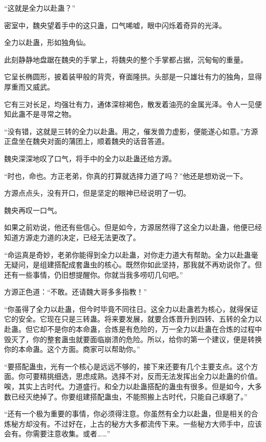 
\begin{this_body}



“这就是全力以赴蛊？”

密室中，魏央望着手中的这只蛊，口气唏嘘，眼中闪烁着奇异的光泽。

全力以赴蛊，形如独角仙。

此刻静静地盘踞在魏央的手掌上，将魏央的整个手掌都占据，沉甸甸的重量。

它呈长椭圆形，披着装甲般的背壳，脊面隆拱。头部是一只雄壮有力的独角，显得厚重而又威武。

它有三对长足，均强壮有力，通体深棕褐色，散发着油亮的金属光泽。令人一见便知此蛊不是寻常之物。

“没有错，这就是三转的全力以赴蛊。用之，催发兽力虚影，便能遂心如意。”方源正盘坐在魏央对面的蒲团上，顺着魏央的话音答道。

魏央深深地叹了口气，将手中的全力以赴蛊还给方源。

“时也，命也。方正老弟，你真的打算就选择力道了吗？”他还是想劝说一下。

方源点点头，没有开口，但是坚定的眼神已经说明了一切。

魏央再叹一口气。

如果之前劝说，他还有些信心。但是如今，方源居然得了这全力以赴蛊，他便已经知道方源走力道的决定，已经无法更改了。

“命运真是奇妙，老弟你能得到全力以赴蛊，对你走力道大有帮助。全力以赴蛊毫无疑问，是组建搭配成套蛊虫的核心。既然你如此坚持，那我就不再劝说你了。但还有一些事情，仍旧想提醒你。你就当我多唠叨几句吧。”

方源正色道：“不敢。还请魏大哥多多指教！”

“你虽得了全力以赴蛊，但今时毕竟不同往日。这全力以赴蛊若为核心，就得保证它的安全。它现在只是三转蛊。将来要发展，就要合炼晋升到四转、五转的全力以赴蛊。但它却不是你的本命蛊，合炼是有危险的，万一全力以赴蛊在合炼的过程中毁灭了，你的整套蛊虫就要面临崩溃的危险。所以，给你的第一个建议，便是转换你的本命蛊。这个方面。商家可以帮助你。”

“要搭配蛊虫，光有一个核心是远远不够的，接下来还要有几个主要支点。这个方面。你可要精挑细选，思虑成熟。选择不对，反而无法发挥出全力以赴蛊的价值。唉，其实上古时代。力道盛行。和全力以赴蛊搭配的蛊虫有很多。但是如今，大多数已经灭绝掉了。你要组建搭配蛊虫，不能照搬上古时代，只能自己琢磨了。”

“还有一个极为重要的事情，你必须得注意。你虽然有全力以赴蛊，但是相关的合炼秘方却没有。不过好在，上古的秘方大多都流传下来。一些秘方大师手中，应该会有。你需要注意收集。或者……”


\end{this_body}
